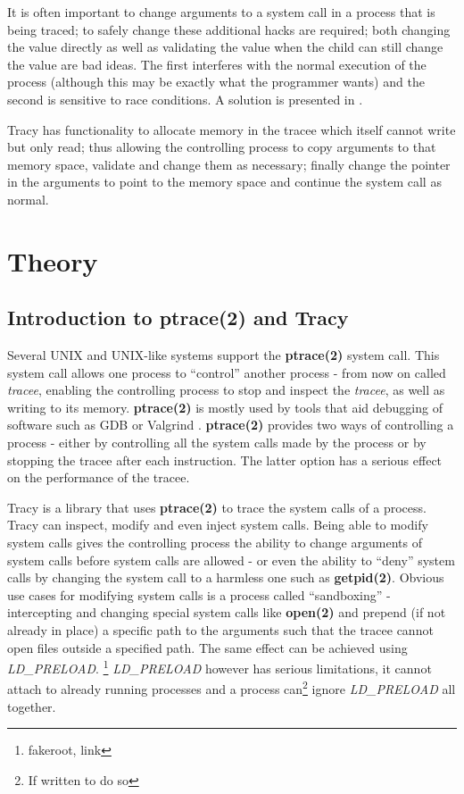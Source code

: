\documentclass[a4paper, twoside, 10pt, twocolumn]{report}
\begin{document}
It is often important to change arguments to a system call in a process that is
being traced; to safely change these additional hacks are required;
both changing the value directly as well as validating the value when the child
can still change the value are bad ideas.
The first interferes with the normal execution of the process
(although this may be exactly what the programmer wants) and the second is
sensitive to race conditions. A solution is presented in
\cite{Noordende_asecure}.

Tracy has functionality to allocate memory in the
tracee which itself cannot write but only read; thus allowing the controlling
process to copy arguments to that memory space, validate and change them as
necessary; finally change the pointer in the arguments to point to the memory
space and continue the system call as normal.

\chapter{Theory}

\section{Introduction to ptrace(2) and Tracy}

Several UNIX and UNIX-like systems support the \textbf{ptrace(2)} system call.
This system call allows one process to ``control'' another process - from now on
called \textit{tracee}, enabling the controlling process to stop and inspect
the \textit{tracee}, as well as writing to its memory. \textbf{ptrace(2)} is
mostly used by tools that aid debugging of software such as GDB\cite{} or
Valgrind \cite{}. \textbf{ptrace(2)} provides two ways of controlling a process
- either by controlling all the system calls made by the process or by stopping
the tracee after each instruction. The latter option has a serious effect on the
performance of the tracee.

Tracy is a library that uses \textbf{ptrace(2)} to trace the system calls of a
process. Tracy can inspect, modify and even inject system calls. Being able to
modify system calls gives the controlling process the ability to change
arguments of system calls before system calls are allowed - or even the ability
to ``deny'' system calls by changing the system call to a harmless one such as
\textbf{getpid(2)}. Obvious use cases for modifying system calls is a process
called ``sandboxing'' - intercepting and changing special system calls like
\textbf{open(2)} and prepend (if not already in place) a specific path to the
arguments such that the tracee cannot open files outside a specified path.
The same effect can be achieved using \textit{LD\_PRELOAD}. \footnote{fakeroot,
link} \textit{LD\_PRELOAD} however has serious limitations, it cannot attach to
already running processes and a process can\footnote{If written to do so} ignore
\textit{LD\_PRELOAD} all together.
\end{document}
